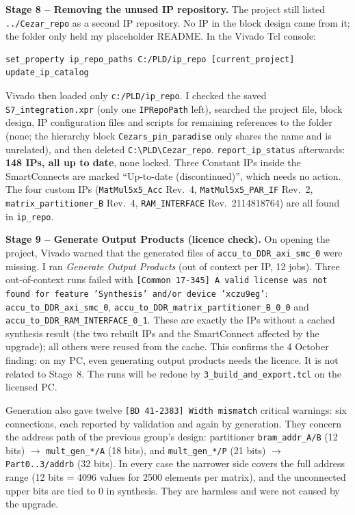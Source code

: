 \documentclass[11pt,a4paper]{article}
\newcommand{\code}[1]{\texttt{#1}}
\begin{document}
\textbf{Stage 8 -- Removing the unused IP repository.} The project still listed \code{../Cezar\_repo} as a second IP repository. No IP in the block design came from it; the folder only held my placeholder README. In the Vivado Tcl console:
\begin{lstlisting}
set_property ip_repo_paths C:/PLD/ip_repo [current_project]
update_ip_catalog
\end{lstlisting}
Vivado then loaded only \code{c:/PLD/ip\_repo}. I checked the saved \code{S7\_integration.xpr} (only one \code{IPRepoPath} left), searched the project file, block design, IP configuration files and scripts for remaining references to the folder (none; the hierarchy block \code{Cezars\_pin\_paradise} only shares the name and is unrelated), and then deleted \code{C:\textbackslash PLD\textbackslash Cezar\_repo}. \code{report\_ip\_status} afterwards: \textbf{148 IPs, all up to date}, none locked. Three Constant IPs inside the SmartConnects are marked ``Up-to-date (discontinued)'', which needs no action. The four custom IPs (\code{MatMul5x5\_Acc} Rev.~4, \code{MatMul5x5\_PAR\_IF} Rev.~2, \code{matrix\_partitioner\_B} Rev.~4, \code{RAM\_INTERFACE} Rev.~2114818764) are all found in \code{ip\_repo}.

\textbf{Stage 9 -- Generate Output Products (licence check).} On opening the project, Vivado warned that the generated files of \code{accu\_to\_DDR\_axi\_smc\_0} were missing. I ran \emph{Generate Output Products} (out of context per IP, 12 jobs). Three out-of-context runs failed with \code{[Common 17-345] A valid license was not found for feature 'Synthesis' and/or device 'xczu9eg'}: \code{accu\_to\_DDR\_axi\_smc\_0}, \code{accu\_to\_DDR\_matrix\_partitioner\_B\_0\_0} and \code{accu\_to\_DDR\_RAM\_INTERFACE\_0\_1}. These are exactly the IPs without a cached synthesis result (the two rebuilt IPs and the SmartConnect affected by the upgrade); all others were reused from the cache. This confirms the 4 October finding: on my PC, even generating output products needs the licence. It is not related to Stage~8. The runs will be redone by \code{3\_build\_and\_export.tcl} on the licensed PC.

Generation also gave twelve \code{[BD 41-2383] Width mismatch} critical warnings: six connections, each reported by validation and again by generation. They concern the address path of the previous group's design: partitioner \code{bram\_addr\_A/B} (12 bits) $\rightarrow$ \code{mult\_gen\_*/A} (18 bits), and \code{mult\_gen\_*/P} (21 bits) $\rightarrow$ \code{Part0..3/addrb} (32 bits). In every case the narrower side covers the full address range (12 bits = 4096 values for 2500 elements per matrix), and the unconnected upper bits are tied to 0 in synthesis. They are harmless and were not caused by the upgrade.
\end{document}

